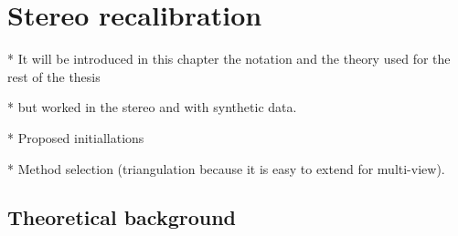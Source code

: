 \chapter{Stereo recalibration}
\label{cha:stereo_recalibration}

* It will be introduced in this chapter the notation and the theory used for the rest of the thesis

* but worked in the stereo and with synthetic data.

* Proposed initiallations

* Method selection (triangulation because it is easy to extend for multi-view).


\section{Theoretical background}
\label{sec:theoretical_background}

